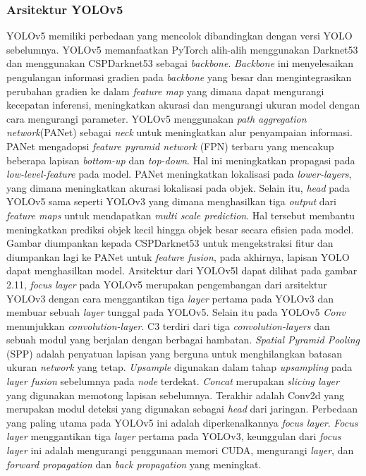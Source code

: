 \subsubsection{Arsitektur YOLOv5}
\label{subsec:arsitektur-yolov5}
YOLOv5 memiliki perbedaan yang mencolok dibandingkan dengan versi YOLO sebelumnya. YOLOv5 memanfaatkan PyTorch alih-alih menggunakan
Darknet53 dan menggunakan CSPDarknet53 sebagai \emph{backbone}. \emph{Backbone} ini menyelesaikan pengulangan informasi gradien pada \emph{backbone} yang besar dan mengintegrasikan
perubahan gradien ke dalam \emph{feature map} yang dimana dapat mengurangi kecepatan inferensi, meningkatkan akurasi dan mengurangi ukuran model dengan cara mengurangi parameter. YOLOv5 menggunakan
\emph{path aggregation network}(PANet) sebagai \emph{neck} untuk meningkatkan alur penyampaian informasi. PANet mengadopsi \emph{feature pyramid network} (FPN) terbaru yang mencakup
beberapa lapisan \emph{bottom-up} dan \emph{top-down}. Hal ini meningkatkan propagasi pada \emph{low-level-feature} pada model. PANet meningkatkan lokalisasi pada \emph{lower-layers}, yang dimana meningkatkan akurasi
lokalisasi pada objek. Selain itu, \emph{head} pada YOLOv5 sama seperti YOLOv3 yang dimana menghasilkan tiga \emph{output} dari \emph{feature maps} untuk mendapatkan \emph{multi scale prediction}. 
Hal tersebut membantu meningkatkan prediksi objek kecil hingga objek besar secara efisien pada model. Gambar diumpankan kepada CSPDarknet53 untuk mengekstraksi fitur dan diumpankan lagi ke PANet untuk \emph{feature fusion}, 
pada akhirnya, lapisan YOLO dapat menghasilkan model. Arsitektur dari YOLOv5l dapat dilihat pada gambar 2.11, \emph{focus layer} pada YOLOv5 merupakan pengembangan dari arsitektur YOLOv3 dengan cara menggantikan tiga \emph{layer}
pertama pada YOLOv3 dan membuar sebuah \emph{layer} tunggal pada YOLOv5. Selain itu pada YOLOv5 \emph{Conv} menunjukkan \emph{convolution-layer}. C3 terdiri dari tiga \emph{convolution-layers} dan sebuah modul yang berjalan dengan berbagai
hambatan. \emph{Spatial Pyramid Pooling} (SPP) adalah penyatuan lapisan yang berguna untuk menghilangkan batasan ukuran \emph{network} yang tetap. \emph{Upsample} digunakan dalam tahap \emph{upsampling} pada \emph{layer fusion} sebelumnya pada
\emph{node} terdekat. \emph{Concat} merupakan \emph{slicing layer} yang digunakan memotong lapisan sebelumnya. Terakhir adalah Conv2d yang merupakan modul deteksi yang digunakan sebagai \emph{head} dari jaringan.
Perbedaan yang paling utama pada YOLOv5 ini adalah diperkenalkannya \emph{focus layer}. \emph{Focus layer} menggantikan tiga \emph{layer} pertama pada YOLOv3, keunggulan dari \emph{focus layer} ini adalah mengurangi penggunaan memori CUDA, mengurangi
\emph{layer}, dan \emph{forward propagation} dan \emph{back propagation} yang meningkat.


